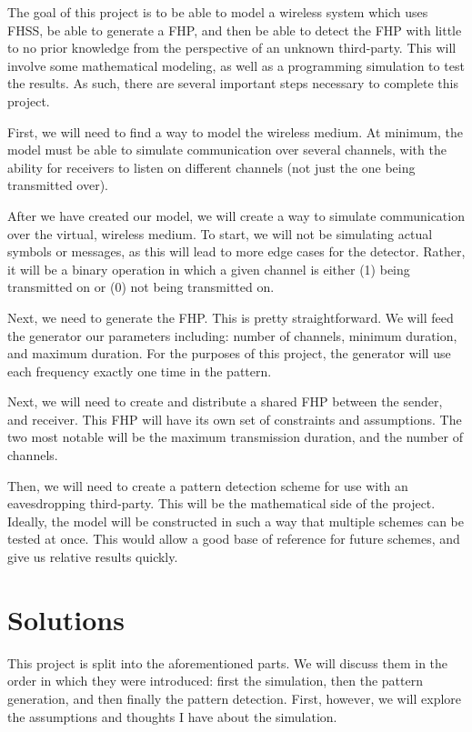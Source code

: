 \documentclass[conference]{IEEEtran}
\begin{document}
The goal of this project is to be able to model a wireless system which uses FHSS, be able to generate a FHP, and then be able to detect the FHP with little to no prior knowledge from the perspective of an unknown third-party.
This will involve some mathematical modeling, as well as a programming simulation to test the results.
As such, there are several important steps necessary to complete this project.

First, we will need to find a way to model the wireless medium.
At minimum, the model must be able to simulate communication over several channels, with the ability for receivers to listen on different channels (not just the one being transmitted over).

After we have created our model, we will create a way to simulate communication over the virtual, wireless medium.
To start, we will not be simulating actual symbols or messages, as this will lead to more edge cases for the detector.
Rather, it will be a binary operation in which a given channel is either (1) being transmitted on or (0) not being transmitted on.

Next, we need to generate the FHP.
This is pretty straightforward.
We will feed the generator our parameters including: number of channels, minimum duration, and maximum duration.
For the purposes of this project, the generator will use each frequency exactly one time in the pattern.

Next, we will need to create and distribute a shared FHP between the sender, and receiver.
This FHP will have its own set of constraints and assumptions.
The two most notable will be the maximum transmission duration, and the number of channels.

Then, we will need to create a pattern detection scheme for use with an eavesdropping third-party.
This will be the mathematical side of the project.
Ideally, the model will be constructed in such a way that multiple schemes can be tested at once.
This would allow a good base of reference for future schemes, and give us relative results quickly.


\section{Solutions}

This project is split into the aforementioned parts.
We will discuss them in the order in which they were introduced: first the simulation, then the pattern generation, and then finally the pattern detection.
First, however, we will explore the assumptions and thoughts I have about the simulation.
\end{document}
